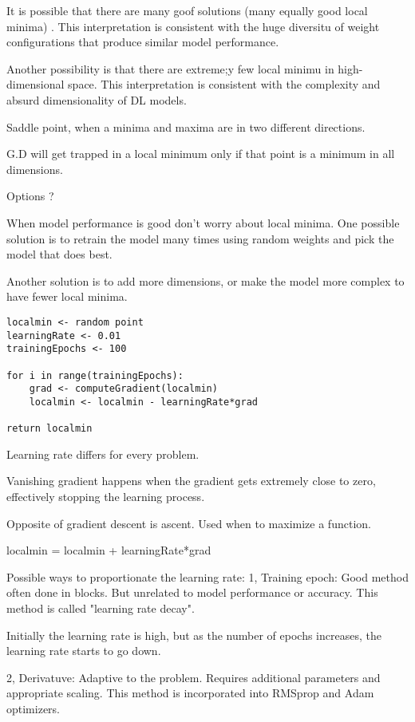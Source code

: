 \documentclass[30pt, a4]{article}
\begin{document}
It is possible that there are many goof solutions (many equally good local minima)
. This interpretation is consistent with the huge diversitu of weight configurations
that produce similar model performance.

Another possibility is that there are extreme;y few local minimu in high-dimensional
space. This interpretation is consistent with the complexity and absurd dimensionality
of DL models. 

Saddle point, when a minima and maxima are in two different directions.

G.D will get trapped in a local minimum only if that point is a minimum in all
dimensions.

Options ?

When model performance is good don't worry about local minima. One possible 
solution is to retrain the model many times using random weights and pick the 
model that does best.

Another solution is to add more dimensions, or make the model more complex to
have fewer local minima.

\begin{lstlisting}
localmin <- random point
learningRate <- 0.01
trainingEpochs <- 100

for i in range(trainingEpochs):
    grad <- computeGradient(localmin)
    localmin <- localmin - learningRate*grad

return localmin
\end{lstlisting}

Learning rate differs for every problem.

Vanishing gradient happens when the gradient gets extremely close to zero,
effectively stopping the learning process.

Opposite of gradient descent is ascent. Used when to maximize a function.

localmin = localmin + learningRate*grad

Possible ways to proportionate the learning rate:
1, Training epoch: Good method often done in blocks. But unrelated to model 
performance or accuracy.
This method is called "learning rate decay".

Initially the learning rate is high, but as the number of epochs increases, the
learning rate starts to go down.

2, Derivatuve: Adaptive to the problem. Requires additional parameters and 
appropriate scaling. This method is incorporated into RMSprop and Adam
optimizers.
\end{document}
